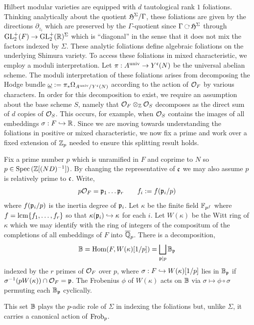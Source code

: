 \documentclass[main.tex]{subfiles}
\begin{document}
Hilbert modular varieties are equipped with $d$ tautological rank $1$ foliations. Thinking analytically about the quotient $\mathfrak{H}^{\Sigma} / \Gamma$, these foliations are given by the directions $\partial_{z_i}$ which are preserved by the $\Gamma$-quotient since $\Gamma \acts \frH^{\Sigma}$ through $\mathrm{GL}_2^+(F) \to \mathrm{GL}_2^+(\mathbb{R})^{\Sigma}$ which is ``diagonal'' in the sense that it does not mix the factors indexed by $\Sigma$. These analytic foliations define algebraic foliations on the underlying Shimura variety. To access these foliations in mixed characteristic, we employ a moduli interpretation. Let $\pi : A^{\mathrm{univ}} \to Y^{\mathfrak{c}}(N)$ be the universal abelian scheme. The moduli interpretation of these foliations arises from decomposing the Hodge bundle $\underline{\omega} := \pi_* \Omega_{A^{\mathrm{univ}}/Y^{\mathfrak{c}}(N)}$ according to the action of $\mathcal{O}_F$ by various characters. In order for this decomposition to exist, we require an assumption about the base scheme $S$, namely that $\mathcal{O}_F \otimes_{\mathbb{Z}} \mathcal{O}_S$ decomposes as the direct sum of $d$ copies of $\mathcal{O}_S$. This occurs, for example, when $\mathcal{O}_S$ contains the images of all embeddings $\sigma : F \hookrightarrow \mathbb{R}$. Since we are moving towards understanding the foliations in positive or mixed characteristic, we now fix a prime and work over a fixed extension of $\mathbb{Z}_p$ needed to ensure this splitting result holds. 
\par 
Fix a prime number $p$ which is unramified in $F$ and coprime to $N$ so $p \in \operatorname{\mathrm{Spec}}{(\mathbb{Z}[(ND)^{-1}])}$. By changing the representative of $\mathfrak{c}$ we may also assume $p$ is relatively prime to $\mathfrak{c}$. Write,
\[ p \mathcal{O}_F = \mathfrak{p}_1 \dots \mathfrak{p}_r \quad \quad f_i := f(\mathfrak{p}_i / p) \]
where $f(\mathfrak{p}_i / p)$ is the inertia degree of $\mathfrak{p}_i$. Let $\kappa$ be the finite field $\mathbb{F}_{p^f}$ where $f = \operatorname{\mathrm{lcm}}\{ f_1, \dots, f_r \}$ so that $\kappa(\mathfrak{p}_i) \hookrightarrow \kappa$ for each $i$. Let $W(\kappa)$ be the Witt ring of $\kappa$ which we may identify with the ring of integers of the compositum of the completions of all embeddings of $F$ into $\overline{\mathbb{Q}}_p$.  There is a decomposition,
\[ \mathbb{B} = \operatorname{\mathrm{Hom}}(F, W(\kappa)[1/p]) = \bigsqcup_{\mathfrak{p} \mid p} \mathbb{B}_{\mathfrak{p}} \]
indexed by the $r$ primes of $\mathcal{O}_F$ over $p$, where $\sigma : F \hookrightarrow W(\kappa)[1/p]$ lies in $\mathbb{B}_{\mathfrak{p}}$ if $\sigma^{-1}(p W(\kappa)) \cap \mathcal{O}_F = \mathfrak{p}$. The Frobenius $\phi$ of $W(\kappa)$ acts on $\mathbb{B}$ via $\sigma \mapsto \phi \circ \sigma$ permuting each $\mathbb{B}_{\mathfrak{p}}$ cyclically. 
\par 
This set $\mathbb{B}$ plays the $p$-adic role of $\Sigma$ in indexing the foliations but, unlike $\Sigma$, it carries a canonical action of $\operatorname{\mathrm{Frob}}_p$. 
\end{document}

